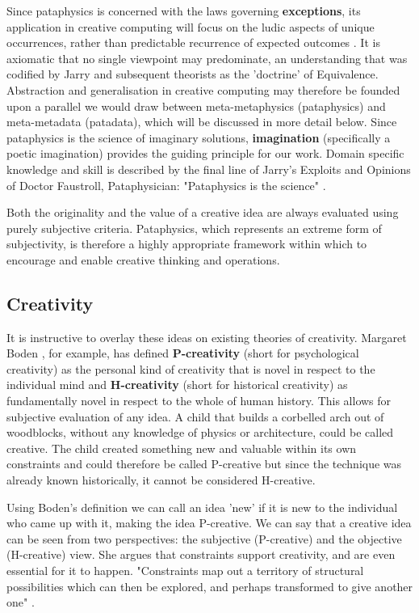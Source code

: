 Since pataphysics is concerned with the laws governing \textbf{exceptions}, its application in creative computing will focus on the ludic aspects of unique occurrences, rather than predictable recurrence of expected outcomes \citep{Bok2002}. It is axiomatic that no single viewpoint may predominate, an understanding that was codified by Jarry and subsequent theorists as the 'doctrine' of Equivalence. Abstraction and generalisation in creative computing may therefore be founded upon a parallel we would draw between meta-metaphysics (pataphysics) and meta-metadata (patadata), which will be discussed in more detail below. Since pataphysics is the science of imaginary solutions, \textbf{imagination} (specifically a poetic imagination) provides the guiding principle for our work. Domain specific knowledge and skill is described by the final line of Jarry's Exploits and Opinions of Doctor Faustroll, Pataphysician: "Pataphysics is the science" \citep[p.114]{Jarry1996}.

Both the originality and the value of a creative idea are always evaluated using purely subjective criteria. Pataphysics, which represents an extreme form of subjectivity, is therefore a highly appropriate framework within which to encourage and enable creative thinking and operations.

\subsection{Creativity}

It is instructive to overlay these ideas on existing theories of creativity. Margaret Boden \citep{Boden2003}, for example, has defined \textbf{P-creativity} (short for psychological creativity) as the personal kind of creativity that is novel in respect to the individual mind and \textbf{H-creativity} (short for historical creativity) as fundamentally novel in respect to the whole of human history. This allows for subjective evaluation of any idea. A child that builds a corbelled arch out of woodblocks, without any knowledge of physics or architecture, could be called creative. The child created something new and valuable within its own constraints and could therefore be called P-creative but since the technique was already known historically, it cannot be considered H-creative.

Using Boden's definition we can call an idea 'new' if it is new to the individual who came up with it, making the idea P-creative. We can say that a creative idea can be seen from two perspectives: the subjective (P-creative) and the objective (H-creative) view. She argues that constraints support creativity, and are even essential for it to happen.  "Constraints map out a territory of structural possibilities which can then be explored, and perhaps transformed to give another one" \citep[p.82]{Boden2003}.

